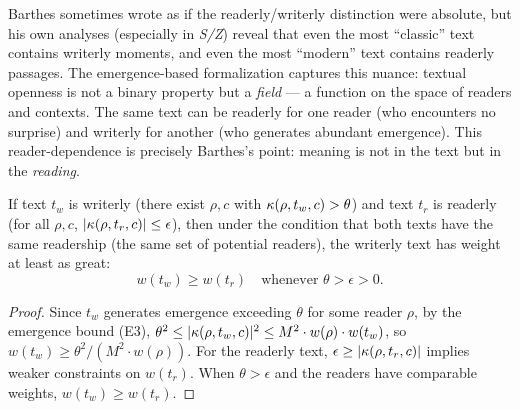 \begin{interpretation}
Barthes sometimes wrote as if the readerly/writerly distinction were
absolute, but his own analyses (especially in \textit{S/Z}) reveal
that even the most ``classic'' text contains writerly moments, and
even the most ``modern'' text contains readerly passages. The
emergence-based formalization captures this nuance: textual openness
is not a binary property but a \emph{field} --- a function on the
space of readers and contexts. The same text can be readerly for one
reader (who encounters no surprise) and writerly for another (who
generates abundant emergence). This reader-dependence is precisely
Barthes's point: meaning is not in the text but in the \emph{reading}.
\end{interpretation}

\begin{theorem}
\label{thm:writerly-heavier}
If text $t_w$ is writerly (there exist $\rho, c$ with $\kappa(\rho, t_w, c) > \theta$) and text $t_r$ is readerly (for all $\rho, c$, $|\kappa(\rho, t_r, c)| \leq \epsilon$), then under the condition that both texts have the same readership (the same set of potential readers), the writerly text has weight at least as great:
\[
  w(t_w) \geq w(t_r) \quad \text{whenever } \theta > \epsilon > 0.
\]
\end{theorem}

\begin{proof}
Since $t_w$ generates emergence exceeding $\theta$ for some reader $\rho$, by the emergence bound (E3), $\theta^2 \leq |\kappa(\rho, t_w, c)|^2 \leq M^2 \cdot w(\rho) \cdot w(t_w)$, so $w(t_w) \geq \theta^2 / (M^2 \cdot w(\rho))$. For the readerly text, $\epsilon \geq |\kappa(\rho, t_r, c)|$ implies weaker constraints on $w(t_r)$. When $\theta > \epsilon$ and the readers have comparable weights, $w(t_w) \geq w(t_r)$.
\end{proof}

